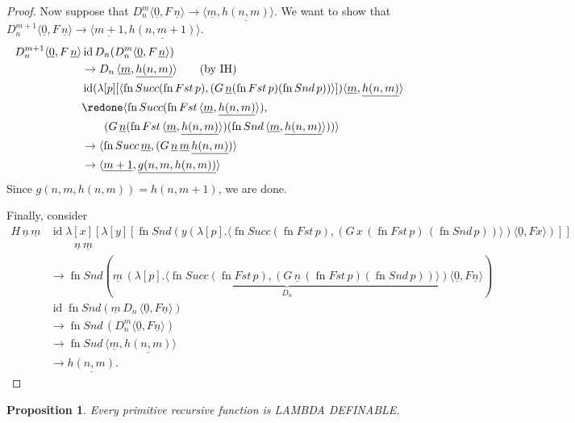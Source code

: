\documentclass[10pt,a4paper]{article}
\newcommand*{\olup}[1]{\MakeUppercase{#1}}
\theoremstyle{plain}
\newtheorem{prop}[thm]{Proposition}
\theoremstyle{definition}
\theoremstyle{remark}
\providecommand{\tuple}[1]{\langle #1 \rangle}
\providecommand{\num}[1]{\underline{#1}}
\providecommand{\lambd}{\ensuremath{\lambda}}
\providecommand{\ident}{\operatorname{id}}
\providecommand{\red}{\mathrel{\rightarrow}}
\providecommand{\fn}{\operatorname{fn}}
\begin{document}
\begin{proof}
  Now suppose that $D_n^m \tuple{\num{0}, F\, \num{n}} \red
  \tuple{\num{m}, \num{h(n, m)}}$. We want to
  show that $D_n^{m+1} \tuple{\num{0}, F\, \num{n}} \red
  \tuple{\num{m+1}, \num{h(n, m+1)}}$.
  \begin{align*}
    D_n^{m+1} \tuple{\num{0}, F\, \num{n}}
    & \ident D_n(D_n^{m} \tuple{\num{0}, F\, \num{n}})\\
    & \red D_n\,\tuple{\num{m}, \num{h(n, m)}} \text{\qquad (by IH)}\\
    & \ident (\lambd[p][
      \tuple{
        \fn{Succ} (\fn{Fst}\, p), (G \, \num{n} (\fn{Fst}\, p) (\fn{Snd}\, p))
    }]) \tuple{\num{m}, \num{h(n,m)}}\\
    & \redone
    \tuple{\fn{Succ} (\fn{Fst}\, \tuple{\num{m}, \num{h(n,m)}}),\\
      & \qquad (G \, \num{n} (\fn{Fst}\, \tuple{\num{m}, \num{h(n,m)}}) (\fn{Snd}\, \tuple{\num{m}, \num{h(n,m)}}))}\\
    & \red 
    \tuple{\fn{Succ}\, \num{m}, (G \, \num{n} \,\num{m} \, \num{h(n,m)})}\\
    & \red \tuple{\num{m+1}, \num{g(n, m, h(n, m))}}
  \end{align*}
  Since $g(n, m, h(n, m)) = h(n, m+1)$, we are done.

  Finally, consider
  \begin{align*}
    H\,\num n\,\num m &\ident \lambd[x][\lambd[y][\fn{Snd} (y
        (\lambd[p].\tuple{\fn{Succ} (\fn{Fst}\, p), (G\, x\,
          (\fn{Fst}\, p)\, (\fn{Snd}\, p))}) \tuple{\num{0}, F x})]]\\
    & \qquad\,\num n\, \num m\\
    & \red \fn{Snd} (\num m \,
    \underbrace{(\lambd[p].\tuple{\fn{Succ} (\fn{Fst}\, p), (G \,\num n\,
      (\fn{Fst}\, p) (\fn{Snd}\, p))})}_{D_n} \tuple{\num{0}, F \num n})\\
    & \ident \fn{Snd} (\num m \, D_n\, \tuple{\num{0}, F \num n})\\
    & \red \fn{Snd} \,(D_n^m  \tuple{\num{0}, F \num n})\\
    & \red \fn{Snd} \,\tuple{\num{m}, \num{h(n, m)}} \\
    & \red \num{h(n,m)}. 
  \end{align*}  
\end{proof}


\begin{prop}
  Every primitive recursive function is \olup{lambda definable}.
\end{prop}
\end{document}
